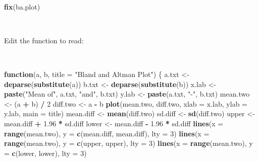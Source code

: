\documentclass[12pt,a4paper]{book}
\newenvironment{Shaded}{\begin{snugshade}}{\end{snugshade}}
\newcommand{\KeywordTok}[1]{\textcolor[rgb]{0.13,0.29,0.53}{\textbf{#1}}}
\newcommand{\DataTypeTok}[1]{\textcolor[rgb]{0.13,0.29,0.53}{#1}}
\newcommand{\DecValTok}[1]{\textcolor[rgb]{0.00,0.00,0.81}{#1}}
\newcommand{\FloatTok}[1]{\textcolor[rgb]{0.00,0.00,0.81}{#1}}
\newcommand{\StringTok}[1]{\textcolor[rgb]{0.31,0.60,0.02}{#1}}
\newcommand{\ControlFlowTok}[1]{\textcolor[rgb]{0.13,0.29,0.53}{\textbf{#1}}}
\newcommand{\OperatorTok}[1]{\textcolor[rgb]{0.81,0.36,0.00}{\textbf{#1}}}
\newcommand{\NormalTok}[1]{#1}
\theoremstyle{definition}
\theoremstyle{definition}
\theoremstyle{definition}
\theoremstyle{remark}
\begin{document}
~

\begin{Shaded}
\begin{Highlighting}[]
\KeywordTok{fix}\NormalTok{(ba.plot)}
\end{Highlighting}
\end{Shaded}

~

Edit the function to read:

~

\begin{Shaded}
\begin{Highlighting}[]
\ControlFlowTok{function}\NormalTok{(a, b, }\DataTypeTok{title =} \StringTok{"Bland and Altman Plot"}\NormalTok{) \{}
\NormalTok{  a.txt <-}\StringTok{ }\KeywordTok{deparse}\NormalTok{(}\KeywordTok{substitute}\NormalTok{(a))}
\NormalTok{  b.txt <-}\StringTok{ }\KeywordTok{deparse}\NormalTok{(}\KeywordTok{substitute}\NormalTok{(b))}
\NormalTok{  x.lab <-}\StringTok{ }\KeywordTok{paste}\NormalTok{(}\StringTok{"Mean of"}\NormalTok{, a.txt, }\StringTok{"and"}\NormalTok{, b.txt)}
\NormalTok{  y.lab <-}\StringTok{ }\KeywordTok{paste}\NormalTok{(a.txt, }\StringTok{"-"}\NormalTok{, b.txt)}
\NormalTok{  mean.two <-}\StringTok{ }\NormalTok{(a }\OperatorTok{+}\StringTok{ }\NormalTok{b) }\OperatorTok{/}\StringTok{ }\DecValTok{2}
\NormalTok{  diff.two <-}\StringTok{ }\NormalTok{a }\OperatorTok{-}\StringTok{ }\NormalTok{b}
  \KeywordTok{plot}\NormalTok{(mean.two, diff.two, }\DataTypeTok{xlab =}\NormalTok{ x.lab, }\DataTypeTok{ylab =}\NormalTok{ y.lab, }\DataTypeTok{main =}\NormalTok{ title) }
\NormalTok{  mean.diff <-}\StringTok{ }\KeywordTok{mean}\NormalTok{(diff.two)}
\NormalTok{  sd.diff <-}\StringTok{ }\KeywordTok{sd}\NormalTok{(diff.two)}
\NormalTok{  upper <-}\StringTok{ }\NormalTok{mean.diff }\OperatorTok{+}\StringTok{ }\FloatTok{1.96} \OperatorTok{*}\StringTok{ }\NormalTok{sd.diff}
\NormalTok{  lower <-}\StringTok{ }\NormalTok{mean.diff }\OperatorTok{-}\StringTok{ }\FloatTok{1.96} \OperatorTok{*}\StringTok{ }\NormalTok{sd.diff}
  \KeywordTok{lines}\NormalTok{(}\DataTypeTok{x =} \KeywordTok{range}\NormalTok{(mean.two), }\DataTypeTok{y =} \KeywordTok{c}\NormalTok{(mean.diff, mean.diff), }\DataTypeTok{lty =} \DecValTok{3}\NormalTok{) }
  \KeywordTok{lines}\NormalTok{(}\DataTypeTok{x =} \KeywordTok{range}\NormalTok{(mean.two), }\DataTypeTok{y =} \KeywordTok{c}\NormalTok{(upper, upper), }\DataTypeTok{lty =} \DecValTok{3}\NormalTok{)}
  \KeywordTok{lines}\NormalTok{(}\DataTypeTok{x =} \KeywordTok{range}\NormalTok{(mean.two), }\DataTypeTok{y =} \KeywordTok{c}\NormalTok{(lower, lower), }\DataTypeTok{lty =} \DecValTok{3}\NormalTok{)}

\end{Highlighting}
\end{Shaded}
\end{document}
